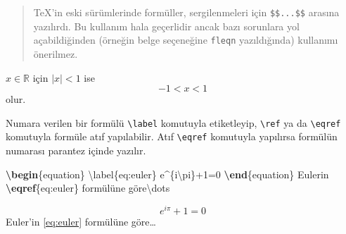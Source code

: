 \documentclass[
  10pt,
]{scrbook}
\newenvironment{Shaded}{}{}
\newcommand{\ExtensionTok}[1]{#1}
\newcommand{\FunctionTok}[1]{\textcolor[rgb]{0.02,0.16,0.49}{#1}}
\newcommand{\KeywordTok}[1]{\textcolor[rgb]{0.00,0.44,0.13}{\textbf{#1}}}
\newcommand{\NormalTok}[1]{#1}
\newcommand{\SpecialCharTok}[1]{\textcolor[rgb]{0.25,0.44,0.63}{#1}}
\newcommand{\SpecialStringTok}[1]{\textcolor[rgb]{0.73,0.40,0.53}{#1}}
\theoremstyle{definition}
\theoremstyle{definition}
\theoremstyle{definition}
\theoremstyle{definition}
\theoremstyle{remark}
\begin{document}
\begin{quote}
TeX'in eski sürümlerinde formüller, sergilenmeleri için \texttt{\$\$...\$\$} arasına yazılırdı. Bu kullanım hala geçerlidir ancak bazı sorunlara yol açabildiğinden (örneğin belge seçeneğine \texttt{fleqn} yazıldığında) kullanımı önerilmez.
\end{quote}

\begin{Shaded}
\end{Shaded}

\(x\in\mathbb{R}\) için \(|x|<1\) ise \begin{equation*}
 -1<x<1
\end{equation*} olur.

Numara verilen bir formülü \texttt{\textbackslash{}label} komutuyla etiketleyip, \texttt{\textbackslash{}ref} ya da \texttt{\textbackslash{}eqref} komutuyla formüle atıf yapılabilir. Atıf \texttt{\textbackslash{}eqref} komutuyla yapılırsa formülün numarası parantez içinde yazılır.

\begin{Shaded}
\begin{Highlighting}[]
\KeywordTok{\textbackslash{}begin}\NormalTok{\{}\ExtensionTok{equation}\NormalTok{\}}
\SpecialCharTok{\textbackslash{}label}\SpecialStringTok{\{eq:euler\}}
\SpecialStringTok{  e\^{}\{i}\SpecialCharTok{\textbackslash{}pi}\SpecialStringTok{\}+1=0}
\KeywordTok{\textbackslash{}end}\NormalTok{\{}\ExtensionTok{equation}\NormalTok{\}}
\NormalTok{Euler\textquotesingle{}in }\KeywordTok{\textbackslash{}eqref}\NormalTok{\{}\ExtensionTok{eq:euler}\NormalTok{\} formülüne göre}\FunctionTok{\textbackslash{}dots}
\end{Highlighting}
\end{Shaded}

\begin{equation}
 e^{i\pi}+1=0
 \label{eq:euler}
\end{equation} Euler'in \eqref{eq:euler} formülüne göre\ldots{}
\end{document}
